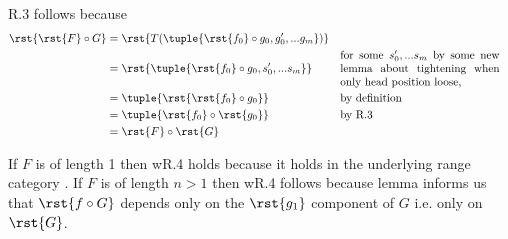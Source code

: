 R.3 follows because
\begin{align*}
\rst{\rst{F} \circ G} 
                   &= \rst{T(\tuple{\rst{f_0} \circ g_0, g'_0,...g_m})}\\
                   &= \rst{\tuple{\rst{f_0} \circ g_0,s'_0,...s_m}}
                                             &&\mbox{\parbox{5cm}{for some $s'_0,...s_m$
                                                       by some new lemma about tightening when only head position loose,}}\\
                   &=\tuple{\rst{\rst{f_0} \circ g_0}} 
                                            && \mbox{by definition}\\
                   &=\tuple{\rst{f_0} \circ \rst{g_0}}  
                                            && \mbox{by R.3}\\
                   &=\rst{F} \circ \rst{G}      
\end{align*}

If $F$ is of length 1 then wR.4 holds because
it holds in the underlying range category \catcw. 
If $F$ is of length $n > 1$ then wR.4 follows because lemma
 informs us that $\rst{f \circ G}$ depends only on the $\rst{g_1}$ component of $G$ i.e. only on $\rst{G}$.

